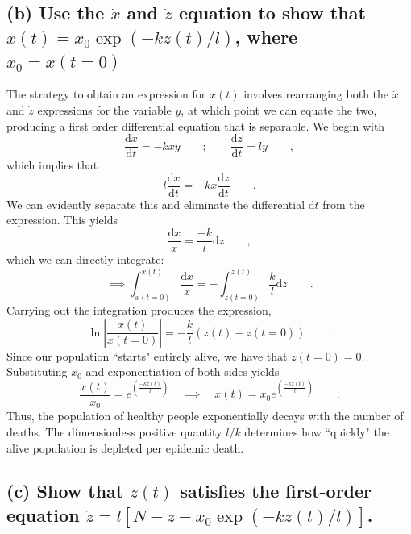 \documentclass[draft]{agujournal2019}
\begin{document}
\subsection{(b) Use the $\dot x$ and $\dot z$ equation to show that $x(t)=x_0\exp{\left(-kz(t)/l\right)}$, where $x_0=x(t=0)$}
\label{ssec:p2b}

The strategy to obtain an expression for $x(t)$ involves rearranging both the $\dot x$ and $\dot z$ expressions for the variable $y$, at which point we can equate the two, producing a first order differential equation that is separable. We begin with
\begin{equation*}
    \frac{\mathrm{d}x}{\mathrm{d}t} = -k xy \qquad ; \qquad \frac{\mathrm{d}z}{\mathrm{d}t} = ly \qquad ,
\end{equation*}
which implies that
\begin{equation*}
    l \frac{\mathrm{d}x}{\mathrm{d}t} = -k x \frac{\mathrm{d}z}{\mathrm{d}t}  \qquad .
\end{equation*}
We can evidently separate this and eliminate the differential $\mathrm{d}t$ from the expression. This yields
\begin{equation*}
    \frac{\mathrm{d}x}{x} = \frac{-k}{l} \mathrm{d}z \qquad ,
\end{equation*}
which we can directly integrate:
\begin{equation*}
    \implies \int_{x(t=0)}^{x(t)} \frac{\mathrm{d}x}{x} = -\int_{z(t=0)}^{z(t)} \frac{k}{l} \mathrm{d}z \qquad .
\end{equation*}
Carrying out the integration produces the expression,
\begin{equation*}
    \ln{\left|\frac{x(t)}{x(t=0)}\right|} = -\frac{k}{l} (z(t) - z(t=0)) \qquad .
\end{equation*}
Since our population ``starts" entirely alive, we have that $z(t=0) = 0$. Substituting $x_0$ and exponentiation of both sides yields
\begin{equation*}
    \frac{x(t)}{x_0} = e^{\left(\frac{-kz(t)}{l}\right)} \quad \implies \quad x(t) = x_0 e^{\left(\frac{-kz(t)}{l}\right)}  \qquad .
\end{equation*}
Thus, the population of healthy people exponentially decays with the number of deaths. The dimensionless positive quantity $l/k$ determines how ``quickly" the alive population is depleted per epidemic death. 



\subsection{(c) Show that $z(t)$ satisfies the first-order equation $\dot z = l \left[N - z - x_0\exp{\left(-kz(t)/l\right)}\right]$.}
\label{ssec:p2c}
\end{document}
